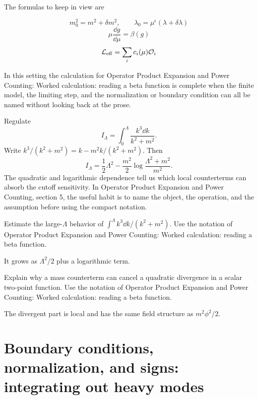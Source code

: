 The formulas to keep in view are

\[
  m_0^2=m^2+\delta m^2,\qquad \lambda_0=\mu^\epsilon(\lambda+\delta\lambda)
\]
\[
  \mu\frac{\dd g}{\dd\mu}=\beta(g)
\]
\[
  \mathcal L_{\mathrm{eff}}=\sum_i c_i(\mu)\mathcal O_i
\]

In this setting the calculation for Operator Product Expansion and Power Counting: Worked calculation: reading a beta function is complete when the finite model, the limiting step, and the normalization or boundary condition can all be named without looking back at the prose.




\begin{example}
Regulate
\[
  I_\Lambda=\int_0^\Lambda\frac{k^3\dd k}{k^2+m^2}.
\]
Write \(k^3/(k^2+m^2)=k-m^2k/(k^2+m^2)\).  Then
\[
  I_\Lambda=\frac12\Lambda^2-\frac{m^2}{2}\log\frac{\Lambda^2+m^2}{m^2}.
\]
The quadratic and logarithmic dependence tell us which local counterterms can absorb the cutoff sensitivity.  In Operator Product Expansion and Power Counting, section 5, the useful habit is to name the object, the operation, and the assumption before using the compact notation.
\end{example}



\begin{exercise}
Estimate the large-\(\Lambda\) behavior of \(\int^\Lambda k^3\dd k/(k^2+m^2)\).  Use the notation of Operator Product Expansion and Power Counting: Worked calculation: reading a beta function.
\begin{answer}
It grows as \(\Lambda^2/2\) plus a logarithmic term.
\end{answer}
\end{exercise}

\begin{exercise}
Explain why a mass counterterm can cancel a quadratic divergence in a scalar two-point function.  Use the notation of Operator Product Expansion and Power Counting: Worked calculation: reading a beta function.
\begin{answer}
The divergent part is local and has the same field structure as \(m^2\phi^2/2\).
\end{answer}
\end{exercise}



\section{Boundary conditions, normalization, and signs: integrating out heavy modes}

